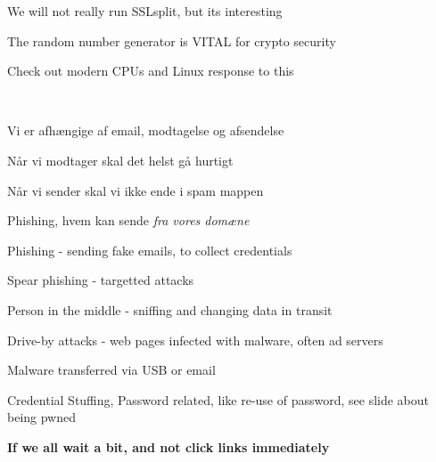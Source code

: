 \documentclass[Screen16to9,17pt]{foils}
\begin{document}
\centerline{We will not really run SSLsplit, but its interesting}










{\small{}}

\centerline{The random number generator is VITAL for crypto security}

Check out modern CPUs and Linux response to this\\



{~}

\begin{list2}
\item Vi er afhængige af email, modtagelse og afsendelse
\item Når vi modtager skal det helst gå hurtigt
\item Når vi sender skal vi ikke ende i spam mappen
\item Phishing, hvem kan sende \emph{fra vores domæne}
\end{list2}



\begin{list2}
\item Phishing - sending fake emails, to collect credentials
\item Spear phishing - targetted attacks
\item Person in the middle - sniffing and changing data in transit
\item Drive-by attacks - web pages infected with malware, often ad servers
\item Malware transferred via USB or email
\item Credential Stuffing, Password related, like re-use of password, see slide about being pwned
\end{list2}

\vskip 1cm
\centerline{\Large\bf If we all wait a bit, and not click links immediately}
\end{document}
